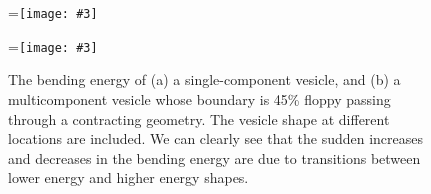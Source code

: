 \documentclass[twoside,twocolumn,9pt]{article}
\newcommand{\subfigimg}[3][,]{%
  \setbox1=\hbox{\texttt{[image: \#3]}}%
  \leavevmode\rlap{\usebox1}%
  \rlap{\hspace*{0pt}\raisebox{\dimexpr\ht1-0\baselineskip}{\bf
  \normalsize #2}}%
  \phantom{\usebox1}%
}
\begin{document}
\begin{figure}[h]
  \centering
  \subfigimg[width=\columnwidth]{(a)}{figures/ContractingEnergy_SC.pdf}
  \subfigimg[width=\columnwidth]{(b)}{figures/ContractingEnergy_MC.pdf}
  \caption{\label{fig:bendingSC_contracting} \small The bending energy
  of (a) a single-component vesicle, and (b) a multicomponent vesicle
  whose boundary is 45\% floppy passing through a contracting geometry.
  The vesicle shape at different locations are included. We can clearly
  see that the sudden increases and decreases in the bending energy are
  due to transitions between lower energy and higher energy shapes.}
\end{figure}



\end{document}
